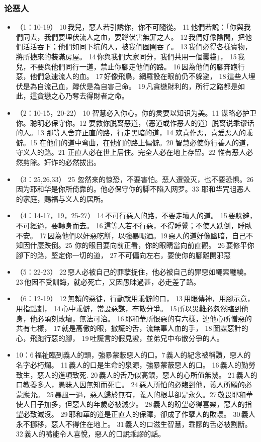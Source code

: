 \subsubsection{论恶人}
\begin{itemize}
\itemsep-.45em 
\item （1：10-19） 10 我兒，惡人若引誘你，你不可隨從。 11 他們若說：「你與我們同去，我們要埋伏流人之血，要蹲伏害無罪之人。 12 我們好像陰間，把他們活活吞下；他們如同下坑的人，被我們囫圇吞了。 13 我們必得各樣寶物，將所擄來的裝滿房屋。 14 你與我們大家同分，我們共用一個囊袋」， 15 我兒，不要與他們同行一道，禁止你腳走他們的路。 16 因為他們的腳奔跑行惡，他們急速流人的血。 17 好像飛鳥，網羅設在眼前仍不躲避， 18 這些人埋伏是為自流己血，蹲伏是為自害己命。 19 凡貪戀財利的，所行之路都是如此，這貪戀之心乃奪去得財者之命。
\item （2：10-15，20-22） 10 智慧必入你心。你的灵要以知识为美。11 谋略必护卫你。聪明必保守你。12 要救你脱离恶道，（恶道或作恶人的道）脱离说乖谬话的人。13 那等人舍弃正直的路，行走黑暗的道，14 欢喜作恶，喜爱恶人的乖僻。15 在他们的道中弯曲，在他们的路上偏僻。20 智慧必使你行善人的道，守义人的路。21 正直人必在世上居住。完全人必在地上存留。22 惟有恶人必然剪除。奸诈的必然拔出。
\item （3：25,26,33） 25 忽然来的惊恐，不要害怕。恶人遭毁灭，也不要恐惧。26 因为耶和华是你所倚靠的。他必保守你的脚不陷入网罗。33 耶和华咒诅恶人的家庭，赐福与义人的居所。
\item （4：14-17，19，25-27） 14 不可行惡人的路，不要走壞人的道。 15 要躲避，不可經過，要轉身而去。 16 這等人若不行惡，不得睡覺；不使人跌倒，睡臥不安。 17 因為他們以奸惡吃餅，以強暴喝酒。19 惡人的道好像幽暗，自己不知因什麼跌倒。25 你的眼目要向前正看，你的眼睛當向前直觀。 26 要修平你腳下的路，堅定你一切的道， 27 不可偏向左右，要使你的腳離開邪惡
\item （5：22-23） 22 惡人必被自己的罪孽捉住，他必被自己的罪惡如繩索纏繞。 23 他因不受訓誨，就必死亡，又因愚昧過甚，必走差了路。
\item （6：12-19） 12 無賴的惡徒，行動就用乖僻的口， 13 用眼傳神，用腳示意，用指點劃， 14 心中乖僻，常設惡謀，布散分爭。 15 所以災難必忽然臨到他身，他必頃刻敗壞，無法可治。 16 耶和華所恨惡的有六樣，連他心所憎惡的共有七樣， 17 就是高傲的眼，撒謊的舌，流無辜人血的手， 18 圖謀惡計的心，飛跑行惡的腳， 19 吐謊言的假見證，並弟兄中布散分爭的人。
\item 10：6 福祉臨到義人的頭，強暴蒙蔽惡人的口。7 義人的紀念被稱讚，惡人的名字必朽爛。 11 義人的口是生命的泉源，強暴蒙蔽惡人的口。 16 義人的勤勞致生，惡人的進項致死. 20 義人的舌乃似高銀，惡人的心所值無幾。 21 義人的口教養多人，愚昧人因無知而死亡。 24 惡人所怕的必臨到他，義人所願的必蒙應允。 25 暴風一過，惡人歸於無有，義人的根基卻是永久。27 敬畏耶和華使人日子加多，但惡人的年歲必被減少。 28 義人的盼望必得喜樂，惡人的指望必致滅沒。 29 耶和華的道是正直人的保障，卻成了作孽人的敗壞。 30 義人永不挪移，惡人不得住在地上。 31 義人的口滋生智慧，乖謬的舌必被割斷。 32 義人的嘴能令人喜悅，惡人的口說乖謬的話。

\end{itemize}
